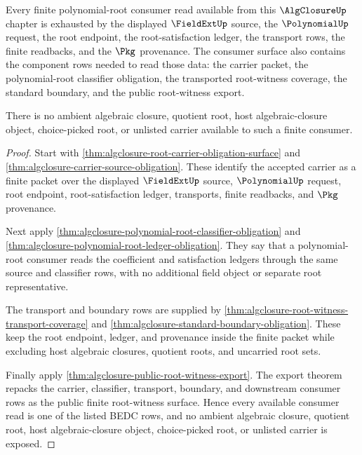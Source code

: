 \begin{theorem}
\label{thm:algclosure-finite-root-witness-consumer-completeness}
Every finite polynomial-root consumer read available from this
$\AlgClosureUp$ chapter is exhausted by the displayed $\FieldExtUp$ source,
the $\PolynomialUp$ request, the root endpoint, the root-satisfaction ledger,
the transport rows, the finite readbacks, and the $\Pkg$ provenance. The
consumer surface also contains the component rows needed to read those data:
the carrier packet, the polynomial-root classifier obligation, the transported
root-witness coverage, the standard boundary, and the public root-witness
export.

There is no ambient algebraic closure, quotient root, host
algebraic-closure object, choice-picked root, or unlisted carrier available to
such a finite consumer.
\end{theorem}
\begin{proof}
Start with
\autoref{thm:algclosure-root-carrier-obligation-surface} and
\autoref{thm:algclosure-carrier-source-obligation}. These identify the
accepted carrier as a finite packet over the displayed $\FieldExtUp$ source,
$\PolynomialUp$ request, root endpoint, root-satisfaction ledger, transports,
finite readbacks, and $\Pkg$ provenance.

Next apply
\autoref{thm:algclosure-polynomial-root-classifier-obligation} and
\autoref{thm:algclosure-polynomial-root-ledger-obligation}. They say that a
polynomial-root consumer reads the coefficient and satisfaction ledgers through
the same source and classifier rows, with no additional field object or
separate root representative.

The transport and boundary rows are supplied by
\autoref{thm:algclosure-root-witness-transport-coverage} and
\autoref{thm:algclosure-standard-boundary-obligation}. These keep the root
endpoint, ledger, and provenance inside the finite packet while excluding host
algebraic closures, quotient roots, and uncarried root sets.

Finally apply \autoref{thm:algclosure-public-root-witness-export}. The export
theorem repacks the carrier, classifier, transport, boundary, and downstream
consumer rows as the public finite root-witness surface. Hence every available
consumer read is one of the listed BEDC rows, and no ambient algebraic closure,
quotient root, host algebraic-closure object, choice-picked root, or unlisted
carrier is exposed.
\end{proof}

